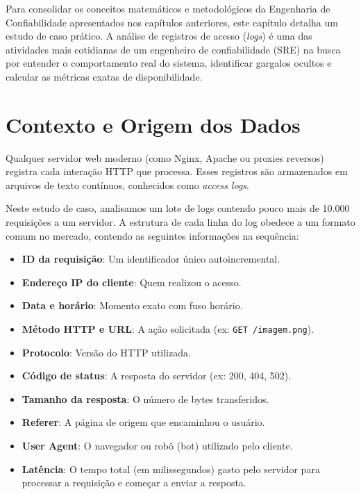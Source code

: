 \documentclass[12pt,a4paper]{report}
\begin{document}
Para consolidar os conceitos matemáticos e metodológicos da Engenharia de Confiabilidade apresentados nos capítulos anteriores, este capítulo detalha um estudo de caso prático. A análise de registros de acesso (\textit{logs}) é uma das atividades mais cotidianas de um engenheiro de confiabilidade (SRE) na busca por entender o comportamento real do sistema, identificar gargalos ocultos e calcular as métricas exatas de disponibilidade.

\section{Contexto e Origem dos Dados}

Qualquer servidor web moderno (como Nginx, Apache ou proxies reversos) registra cada interação HTTP que processa. Esses registros são armazenados em arquivos de texto contínuos, conhecidos como \textit{access logs}. 

Neste estudo de caso, analisamos um lote de logs contendo pouco mais de 10.000 requisições a um servidor. A estrutura de cada linha do log obedece a um formato comum no mercado, contendo as seguintes informações na sequência:

\begin{itemize}[nosep]
    \item \textbf{ID da requisição}: Um identificador único autoincremental.
    \item \textbf{Endereço IP do cliente}: Quem realizou o acesso.
    \item \textbf{Data e horário}: Momento exato com fuso horário.
    \item \textbf{Método HTTP e URL}: A ação solicitada (ex: \texttt{GET /imagem.png}).
    \item \textbf{Protocolo}: Versão do HTTP utilizada.
    \item \textbf{Código de status}: A resposta do servidor (ex: 200, 404, 502).
    \item \textbf{Tamanho da resposta}: O número de bytes transferidos.
    \item \textbf{Referer}: A página de origem que encaminhou o usuário.
    \item \textbf{User Agent}: O navegador ou robô (bot) utilizado pelo cliente.
    \item \textbf{Latência}: O tempo total (em milissegundos) gasto pelo servidor para processar a requisição e começar a enviar a resposta.
\end{itemize}
\end{document}
